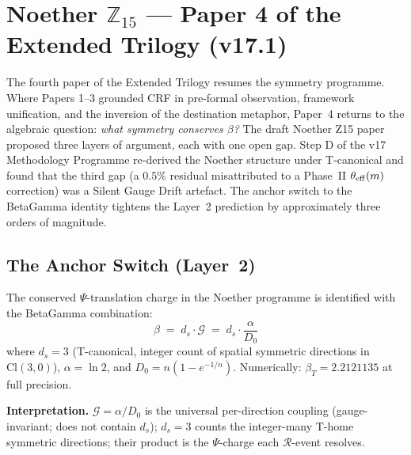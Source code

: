\documentclass[12pt, a4paper]{article}
\begin{document}
\section{Noether $\mathbb{Z}_{15}$ --- Paper 4 of the Extended Trilogy (v17.1)}

The fourth paper of the Extended Trilogy resumes the symmetry programme.
Where Papers 1--3 grounded CRF in pre-formal observation, framework
unification, and the inversion of the destination metaphor, Paper~4
returns to the algebraic question: \emph{what symmetry conserves
$\beta$?} The draft Noether Z15 paper proposed three layers of
argument, each with one open gap. Step D of the v17 Methodology
Programme re-derived the Noether structure under T-canonical and
found that the third gap (a $0.5\%$ residual misattributed to a
Phase~II $\theta_{\rm eff}(m)$ correction) was a Silent Gauge Drift
artefact. The anchor switch to the BetaGamma identity tightens the
Layer~2 prediction by approximately three orders of magnitude.

\subsection{The Anchor Switch (Layer~2)}

\begin{formalbox}[title={DEF-NZ01: T-Canonical Noether Anchor for $\beta$}]
The conserved $\Psi$-translation charge in the Noether programme is
identified with the BetaGamma combination:
\[
  \boxed{\beta \;=\; d_s \cdot \mathcal{G} \;=\; d_s \cdot \frac{\alpha}{D_0}}
\]
where $d_s = 3$ (T-canonical, integer count of spatial symmetric directions
in $\mathrm{Cl}(3,0)$), $\alpha = \ln 2$, and $D_0 = n(1-e^{-1/n})$.
Numerically: $\beta_T = 2.2121135$ at full precision.

\textbf{Interpretation.} $\mathcal{G} = \alpha/D_0$ is the universal
per-direction coupling (gauge-invariant; does not contain $d_s$);
$d_s = 3$ counts the integer-many T-home symmetric directions; their
product is the $\Psi$-charge each $\mathcal{R}$-event resolves.
\end{formalbox}
\end{document}
